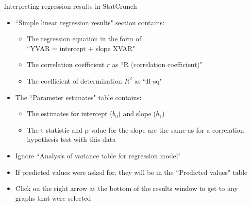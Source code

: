 \documentclass[xcolor=table]{beamer}
\begin{document}
\begin{frame}{Interpreting regression results in StatCrunch}
\begin{block}{}
\large
\begin{itemize}
\item ``Simple linear regression results" section contains:
\begin{itemize}
\item The regression equation in the form of\\ ``YVAR = intercept + slope XVAR"
\item The correlation coefficient $r$ as ``R (correlation coefficient)"
\item The coefficient of determination $R^2$ as ``R-sq"
\end{itemize}
\item The ``Parameter estimates" table contains:
\begin{itemize}
\item The estimates for intercept ($b_0$) and slope ($b_1$)
\item The t statistic and p-value for the slope are the same as for a correlation hypothesis test with this data
\end{itemize}
\item Ignore ``Analysis of variance table for regression model"
\item If predicted values were asked for, they will be in the ``Predicted values" table
\item Click on the right arrow at the bottom of the results window to get to any graphs that were selected
\end{itemize}
\end{block}
\end{frame}
\end{document}
